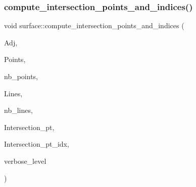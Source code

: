\mbox{\label{classsurface_a620b43a69ca1fa49eb92fea7b6d098a3}} 
\subsubsection{\texorpdfstring{compute\+\_\+intersection\+\_\+points\+\_\+and\+\_\+indices()}{compute\_intersection\_points\_and\_indices()}}
{\footnotesize\ttfamily void surface\+::compute\+\_\+intersection\+\_\+points\+\_\+and\+\_\+indices (\begin{DoxyParamCaption}\item[{\mbox{\hyperlink{galois_8h_a09fddde158a3a20bd2dcadb609de11dc}{I\+NT}} $\ast$}]{Adj,  }\item[{\mbox{\hyperlink{galois_8h_a09fddde158a3a20bd2dcadb609de11dc}{I\+NT}} $\ast$}]{Points,  }\item[{\mbox{\hyperlink{galois_8h_a09fddde158a3a20bd2dcadb609de11dc}{I\+NT}}}]{nb\+\_\+points,  }\item[{\mbox{\hyperlink{galois_8h_a09fddde158a3a20bd2dcadb609de11dc}{I\+NT}} $\ast$}]{Lines,  }\item[{\mbox{\hyperlink{galois_8h_a09fddde158a3a20bd2dcadb609de11dc}{I\+NT}}}]{nb\+\_\+lines,  }\item[{\mbox{\hyperlink{galois_8h_a09fddde158a3a20bd2dcadb609de11dc}{I\+NT}} $\ast$\&}]{Intersection\+\_\+pt,  }\item[{\mbox{\hyperlink{galois_8h_a09fddde158a3a20bd2dcadb609de11dc}{I\+NT}} $\ast$\&}]{Intersection\+\_\+pt\+\_\+idx,  }\item[{\mbox{\hyperlink{galois_8h_a09fddde158a3a20bd2dcadb609de11dc}{I\+NT}}}]{verbose\+\_\+level }\end{DoxyParamCaption})}

\mbox{\label{classsurface_a40ea6e0f443770fb5cb766a2ef20b878}} 
